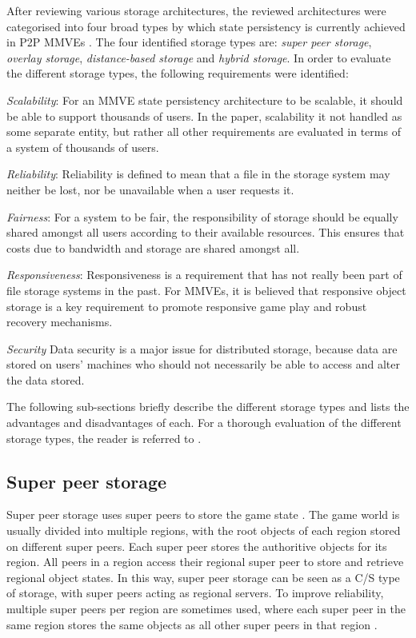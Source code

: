 \documentclass[10pt,a4paper,conference]{IEEEtran}
\begin{document}
After reviewing various storage architectures, the reviewed architectures were categorised into four broad types by which state persistency is
currently achieved in P2P MMVEs \cite{gilmore_p2p_mmog_state_persistency}. The four identified storage types are: \emph{super peer storage},
\emph{overlay storage}, \emph{distance-based storage} and \emph{hybrid storage}. In order to evaluate the different storage types, the following
requirements were identified:

\emph{Scalability}: For an MMVE state persistency architecture to be scalable, it should be able to support thousands of users. In the paper,
scalability it not handled as some separate entity, but rather all other requirements are evaluated in terms of a system of thousands of users.

\emph{Reliability}: Reliability is defined to mean that a file in the storage system may neither be lost, nor be unavailable when a user requests it.

\emph{Fairness}: For a system to be fair, the responsibility of storage should be equally shared amongst all users according to their available
resources. This ensures that costs due to bandwidth and storage are shared amongst all.

\emph{Responsiveness}: Responsiveness is a requirement that has not really been part of file storage systems in the past. For MMVEs, it is believed
that responsive object storage is a key requirement to promote responsive game play and robust recovery mechanisms.

\emph{Security} Data security is a major issue for distributed storage, because data are stored on users' machines who should not necessarily be able
to access and alter the data stored.

The following sub-sections briefly describe the different storage types and lists the advantages and disadvantages of each. For a thorough evaluation
of the different storage types, the reader is referred to \cite{gilmore_p2p_mmog_state_persistency}.

\subsection{Super peer storage}

Super peer storage uses super peers to store the game state \cite{knutsson_p2p_first}. The game world is usually divided into multiple regions, with
the root objects of each region stored on different super peers. Each super peer stores the authoritive objects for its region. All peers in a region
access their regional super peer to store and retrieve regional object states. In this way, super peer storage can be seen as a C/S type of storage,
with super peers acting as regional servers. To improve reliability, multiple super peers per region are sometimes used, where each super peer in the
same region stores the same objects as all other super peers in that region \cite{varvello_p2p_second_life}.
\end{document}
